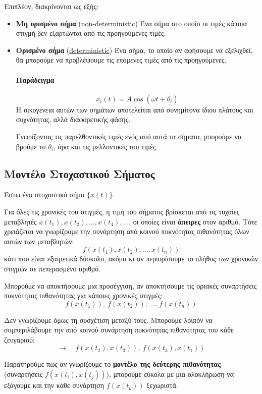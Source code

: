 \documentclass[11pt,a4paper,notitlepage,fleqn,final]{article}
\begin{document}
Επιπλέον, διακρίνονται ως εξής:
\begin{itemize}
	\item \textbf{Μη ορισμένο σήμα}
	(\underline{non-deterministic})
	Ένα σήμα στο οποίο οι τιμές κάποια στιγμή δεν εξαρτώνται
	από τις προηγούμενες τιμές.
	
	\item \textbf{Ορισμένο σήμα} (\underline{deterministic})
	Ένα σήμα, το οποίο αν αφήσουμε να εξελιχθεί, θα μπορούμε
	να προβλέψουμε τις επόμενες τιμές από τις προηγούμενες.
	
	\paragraph{Παράδειγμα}
	\[
	x_i(t) = A\cos(\omega t + \underline{\theta_i})
	\]
	Η οικογένεια αυτών των σημάτων αποτελείται από συνημίτονα
	ίδιου πλάτους και συχνότητας, αλλά διαφορετικής φάσης.
	
	Γνωρίζοντας τις παρελθοντικές τιμές ενός από αυτά τα σήματα,
	μπορούμε να βρούμε το \( \theta_i \), άρα και τις μελλοντικές
	του τιμές.
\end{itemize}
	
\subsection{Μοντέλο Στοχαστικού Σήματος}
Έστω ένα στοχαστικό σήμα \( \big\lbrace x(t) \big\rbrace \).

Για όλες τις χρονικές του στιγμές, η τιμή του σήματος βρίσκεται
από τις τυχαίες μεταβλητές
\( x(t_1),x(t_2),\dots,x(t_4),\dots \), οι οποίες είναι
\textbf{άπειρες} στον αριθμό. Τότε χρειάζεται να γνωρίζουμε
την συνάρτηση από κοινού πυκνότητας πιθανότητας όλων αυτών
των μεταβλητών:
\[
f\left(x(t_1),x(t_2),\dots,x(t_n)\right)
\]
κάτι που είναι εξαιρετικά δύσκολο, ακόμα κι αν περιορίσουμε
το πλήθος των χρονικών στιγμών σε πεπερασμένο αριθμό.

Μπορούμε να αποκτήσουμε μια προσέγγιση, αν αποκτήσουμε τις
οριακές συναρτήσεις πυκνότητας πιθανότητας για κάποιες χρονικές
στιγμές:
\[
f\left(x(t_1)\right),\
f\left(x(t_2)\right),\
\dots,
f\left(x(t_n)\right)
\]

Δεν γνωρίζουμε όμως τη συσχέτιση μεταξύ τους. Μπορούμε λοιπόν
να συμπεριλάβουμε την από κοινού συνάρτηση πυκνότητας πιθανότητας
του κάθε ζευγαριού:
\[
\rightarrow \quad f\left(x(t_2),x(t_3)\right),\
f\left(x(t_3),x(t_1)\right)
\]

Παρατηρούμε πως αν γνωρίζουμε το \textbf{μοντέλο της δεύτερης
πιθανότητας} (συναρτήσεις \( f\left(x(t_i),x(t_j)\right) \)),
μπορούμε εύκολα με μια ολοκλήρωση να εξάγουμε και την κάθε
συνάρτηση \( f\left(x(t_k)\right) \) ξεχωριστά.
\end{document}
